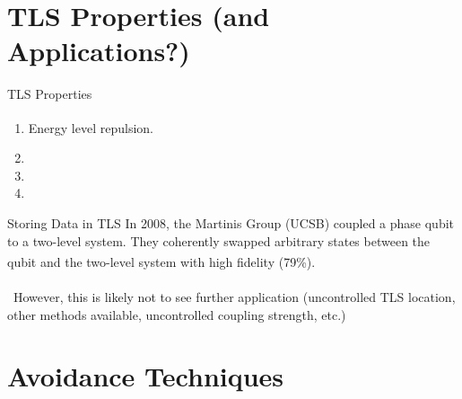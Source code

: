\documentclass{beamer}
\begin{document}
\section{TLS Properties (and Applications?)}

\begin{frame}{TLS Properties}

  \begin{enumerate}
  \item Energy level repulsion.\textsuperscript{\cite{5}}
	\item {}
	\item {}
  \item {}
  \end{enumerate}
\end{frame}


\begin{frame}{Storing Data in TLS}
In 2008, the Martinis Group (UCSB) coupled a phase qubit to a two-level system. They coherently swapped arbitrary states between the qubit and the two-level system with high fidelity (79\%).\textsuperscript{\cite{4}}
\\~\\
\ However, this is likely not to see further application (uncontrolled TLS location, other methods available, uncontrolled coupling strength, etc.)
\end{frame}

\section{Avoidance Techniques}
\end{document}
